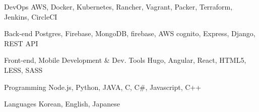 

\begin{cvskills}

  \cvskill
    {DevOps} %
    {AWS, Docker, Kubernetes, Rancher, Vagrant, Packer, Terraform, Jenkins, CircleCI} %

  \cvskill
    {Back-end} %
    {Postgres, Firebase, MongoDB, firebase, AWS cognito, Express, Django, REST API} %

  \cvskill
    {Front-end, Mobile Development \& Dev. Tools} %
    {Hugo, Angular, React, HTML5, LESS, SASS} %

  \cvskill
    {Programming} %
    {Node.js, Python, JAVA, C, C\#, Javascript, C++} %

  \cvskill
    {Languages} %
    {Korean, English, Japanese} %

\end{cvskills}
